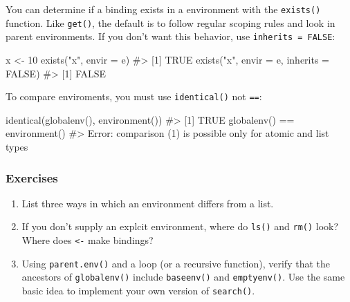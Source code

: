 \documentclass[oneside]{book}
\newenvironment{Shaded}{}{}
\newcommand{\KeywordTok} [1]{\textcolor[rgb]{0.00,0.44,0.13}{{#1}}}
\newcommand{\DataTypeTok}[1]{\textcolor[rgb]{0.56,0.13,0.00}{{#1}}}
\newcommand{\DecValTok}  [1]{\textcolor[rgb]{0.25,0.63,0.44}{{#1}}}
\newcommand{\StringTok}  [1]{\textcolor[rgb]{0.25,0.44,0.63}{{#1}}}
\newcommand{\CommentTok} [1]{\textcolor[rgb]{0.38,0.63,0.69}{{#1}}}
\newcommand{\OtherTok}   [1]{\textcolor[rgb]{0.00,0.44,0.13}{{#1}}}
\newcommand{\NormalTok}  [1]{{#1}}
\begin{document}
You can determine if a binding exists in a environment with the
\texttt{exists()} function. Like \texttt{get()}, the default is to
follow regular scoping rules and look in parent environments. If you
don't want this behavior, use \texttt{inherits = FALSE}:

\begin{Shaded}
\begin{Highlighting}[]
\NormalTok{x <-}\StringTok{ }\DecValTok{10}
\KeywordTok{exists}\NormalTok{(}\StringTok{"x"}\NormalTok{, }\DataTypeTok{envir =} \NormalTok{e)}
\CommentTok{#> [1] TRUE}
\KeywordTok{exists}\NormalTok{(}\StringTok{"x"}\NormalTok{, }\DataTypeTok{envir =} \NormalTok{e, }\DataTypeTok{inherits =} \OtherTok{FALSE}\NormalTok{)}
\CommentTok{#> [1] FALSE}
\end{Highlighting}
\end{Shaded}

To compare enviroments, you must use \texttt{identical()} not
\texttt{==}:

\begin{Shaded}
\begin{Highlighting}[]
\KeywordTok{identical}\NormalTok{(}\KeywordTok{globalenv}\NormalTok{(), }\KeywordTok{environment}\NormalTok{())}
\CommentTok{#> [1] TRUE}
\KeywordTok{globalenv}\NormalTok{() ==}\StringTok{ }\KeywordTok{environment}\NormalTok{()}
\CommentTok{#> Error: comparison (1) is possible only for atomic and list types}
\end{Highlighting}
\end{Shaded}

\subsubsection{Exercises}\label{exercises}

\begin{enumerate}
\def\labelenumi{\arabic{enumi}.}
\item
  List three ways in which an environment differs from a list.
\item
  If you don't supply an explcit environment, where do \texttt{ls()} and
  \texttt{rm()} look? Where does \texttt{\textless{}-} make bindings?
\item
  Using \texttt{parent.env()} and a loop (or a recursive function),
  verify that the ancestors of \texttt{globalenv()} include
  \texttt{baseenv()} and \texttt{emptyenv()}. Use the same basic idea to
  implement your own version of \texttt{search()}.
\end{enumerate}
\end{document}
